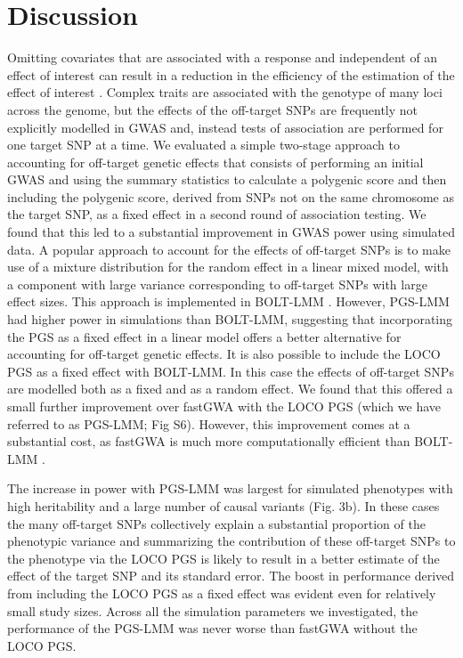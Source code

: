 \documentclass[doublespacing]{bmcart}
\begin{document}
\section*{Discussion}
Omitting covariates that are associated with a response and independent of an effect of interest can result in a reduction in the efficiency of the estimation of the effect of interest \cite{neuhaus1998estimation}. Complex traits are associated with the genotype of many loci across the genome, but the effects of the off-target SNPs are frequently not explicitly modelled in GWAS and, instead tests of association are performed for one target SNP at a time. We evaluated a simple two-stage approach to accounting for off-target genetic effects that consists of performing an initial GWAS and using the summary statistics to calculate a polygenic score and then including the polygenic score, derived from SNPs not on the same chromosome as the target SNP, as a fixed effect in a second round of association testing. We found that this led to a substantial improvement in GWAS power using simulated data. A popular approach to account for the effects of off-target SNPs is to make use of a mixture distribution for the random effect in a linear mixed model, with a component with large variance corresponding to off-target SNPs with large effect sizes. This approach is implemented in BOLT-LMM \cite{BOLT}. However, PGS-LMM had higher power in simulations than BOLT-LMM, suggesting that incorporating the PGS as a fixed effect in a linear model offers a better alternative for accounting for off-target genetic effects. It is also possible to include the LOCO PGS as a fixed effect with BOLT-LMM. In this case the effects of off-target SNPs are modelled both as a fixed and as a random effect. We found that this offered a small further improvement over fastGWA with the LOCO PGS (which we have referred to as PGS-LMM; Fig S6). However, this improvement comes at a substantial cost, as fastGWA is much more computationally efficient than BOLT-LMM \cite{jiang2019resource}. 

The increase in power with PGS-LMM was largest for simulated phenotypes with high heritability and a large number of causal variants (Fig. 3b). In these cases the many off-target SNPs collectively explain a substantial proportion of the phenotypic variance and summarizing the contribution of these off-target SNPs to the phenotype via the LOCO PGS is likely to result in a better estimate of the effect of the target SNP and its standard error. The boost in performance derived from including the LOCO PGS as a fixed effect was evident even for relatively small study sizes. Across all the simulation parameters we investigated, the performance of the PGS-LMM was never worse than fastGWA without the LOCO PGS. 
\end{document}
